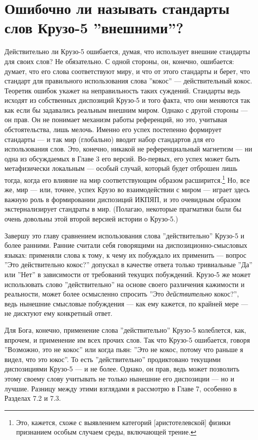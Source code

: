 \documentclass[11pt]{book}
\begin{document}
\section{Ошибочно ли называть стандарты слов Крузо-5 ''внешними''?}

Действительно ли Крузо-5 ошибается, думая, что использует внешние стандарты для своих слов? Не обязательно. С одной стороны, он, конечно, ошибается: думает, что его слова соответствуют миру, и что от этого стандарты и берет, что стандарт для правильного использования слова ''кокос'' --- действительный кокос. Теоретик ошибок укажет на неправильность таких суждений. Стандарты ведь исходят из собственных диспозиций Крузо-5 и того факта, что они меняются так как если бы задавались реальным внешним миром. Однако с другой стороны --- он прав. Он не понимает механизм работы референций, но это, учитывая обстоятельства, лишь мелочь. Именно его успех постепенно формирует стандарты --- и так мир (глобально) вводит набор стандартов для его использования слов. Это, конечно, никакой не референциальный магнетизм --- ни одна из обсуждаемых в Главе 3 его версий. Во-первых, его успех может быть метафизически локальным --- особый случай, который будет отброшен лишь тогда, когда его влияние на мир соответствующим образом расширится.\footnote{Это, кажется, схоже с выявлением категорий [аристотелевской] физики признанием особым случаем среды, включающей трение.} Но, все же, мир --- или, точнее, успех Крузо во взаимодействии с миром --- играет здесь важную роль в формировании диспозиций ИКПЯП, и это очевидным образом экстернализирует стандраты в мир. (Полагаю, некоторые прагматики были бы очень довольны этой второй версией истории о Крузо-5.)

Завершу это главу сравнением использования слова ''действительно'' Крузо-5 и более ранними. Ранние считали себя говорящими на диспозиционно-смысловых языках: применяли слова к тому, к чему их побуждало их применить --- вопрос ''Это действительно кокос?'' допускал в качестве ответа только тривиальные ''Да'' или ''Нет'' в зависимости от требований текущих побуждений. Крузо-5 же может использовать слово ''действительно'' на основе своего различения кажимости и реальности, может более осмысленно спросить ''Это \textit{действительно} кокос?'', ведь нынешние смысловые побуждения --- как ему кажется, по крайней мере --- не дисктуют ему конкретный ответ.

Для Бога, конечно, применение слова ''действительно'' Крузо-5 колеблется, как, впрочем, и применение им всех прочих слов. Так что Крузо-5 ошибается, говоря ''Возможно, это не кокос'' или когда пьян: ''Это не кокос, потому что раньше я видел, что это юкос''. То есть ''действительно'' продиктовано текущими диспозициями Крузо-5 --- и не более. Однако, он прав, ведь может позволить этому своему слову учитывать не только нынешние его диспозиции --- но и лучшие. Разницу между этими взглядами я рассмотрю в Главе 7, особенно в Разделах 7.2 и 7.3.
\end{document}
